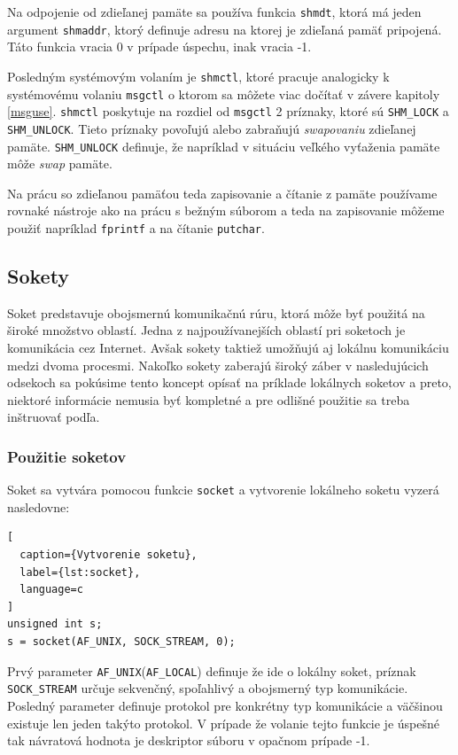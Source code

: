 Na odpojenie od zdieľanej pamäte sa používa funkcia \texttt{shmdt}, ktorá má jeden argument \texttt{shmaddr}, ktorý definuje adresu na ktorej je zdieľaná pamäť pripojená. Táto funkcia vracia 0 v prípade úspechu, inak vracia -1.

Posledným systémovým volaním je \texttt{shmctl}, ktoré pracuje analogicky k systémovému volaniu \texttt{msgctl} o ktorom sa môžete viac dočítať v závere kapitoly \ref{msguse}. \texttt{shmctl} poskytuje na rozdiel od \texttt{msgctl} 2 príznaky, ktoré sú \texttt{SHM\_LOCK} a \texttt{SHM\_UNLOCK}. Tieto príznaky povoľujú alebo zabraňujú \textit{swapovaniu} zdieľanej pamäte. \texttt{SHM\_UNLOCK} definuje, že napríklad v situáciu veľkého vyťaženia pamäte môže \textit{swap} pamäte.\cite{shmctl}

Na prácu so zdieľanou pamäťou teda zapisovanie a čítanie z pamäte používame rovnaké nástroje ako na prácu s bežným súborom a teda na zapisovanie môžeme použiť napríklad \texttt{fprintf} a na čítanie \texttt{putchar}.
\subsection{Sokety}
Soket predstavuje obojsmernú komunikačnú rúru, ktorá môže byť použitá na široké množstvo oblastí. Jedna z najpoužívanejších oblastí pri soketoch je komunikácia cez Internet. Avšak sokety taktiež umožňujú aj lokálnu komunikáciu medzi dvoma procesmi.\cite{beej} Nakoľko sokety zaberajú široký záber v nasledujúcich odsekoch sa pokúsime tento koncept opísať na príklade lokálnych soketov a preto, niektoré informácie nemusia byť kompletné a pre odlišné použitie sa treba inštruovať podľa\cite{socket}.
\subsubsection{Použitie soketov}
Soket sa vytvára pomocou funkcie \texttt{socket} a vytvorenie lokálneho soketu vyzerá nasledovne:
\begin{lstlisting}[
  caption={Vytvorenie soketu},
  label={lst:socket},
  language=c
]
unsigned int s;
s = socket(AF_UNIX, SOCK_STREAM, 0);
\end{lstlisting}
Prvý parameter \texttt{AF\_UNIX}(\texttt{AF\_LOCAL}) definuje že ide o lokálny soket, príznak \texttt{SOCK\_STREAM} určuje sekvenčný, spoľahlivý a obojsmerný typ komunikácie. Posledný parameter definuje protokol pre konkrétny typ komunikácie a väčšinou existuje len jeden takýto protokol. V prípade že volanie tejto funkcie je úspešné tak návratová hodnota je deskriptor súboru v opačnom prípade -1. 

